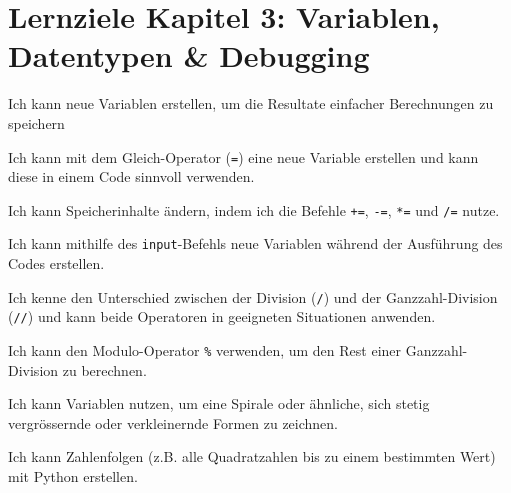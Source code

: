 \section*{Lernziele Kapitel 3: Variablen, Datentypen \& Debugging}
\begin{todolist}
    \item Ich kann neue Variablen erstellen, um die Resultate einfacher Berechnungen zu speichern
    \item Ich kann mit dem Gleich-Operator (\lstinline|=|) eine neue Variable erstellen und kann diese in einem Code sinnvoll verwenden.
    \item Ich kann Speicherinhalte ändern, indem ich die Befehle \lstinline|+=|, \lstinline|-=|, \lstinline|*=| und \lstinline|/=| nutze.
    \item Ich kann mithilfe des \lstinline|input|-Befehls neue Variablen während der Ausführung des Codes erstellen.
    \item Ich kenne den Unterschied zwischen der Division (\lstinline|/|) und der Ganzzahl-Division (\lstinline|//|) und kann beide Operatoren in geeigneten Situationen anwenden.
    \item Ich kann den Modulo-Operator \lstinline|%| verwenden, um den Rest einer Ganzzahl-Division zu berechnen.
    \item Ich kann Variablen nutzen, um eine Spirale oder ähnliche, sich stetig vergrössernde oder verkleinernde Formen zu zeichnen.
    \item Ich kann Zahlenfolgen (z.B. alle Quadratzahlen bis zu einem bestimmten Wert) mit Python erstellen.
\end{todolist}

